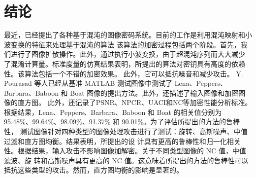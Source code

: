 \chapter{结论}

最近，已经提出了各种基于混沌的图像密码系统。目前的工作是利用混沌映射和小波变换的特征来处理基于混沌的算法
该算法的加密过程包括两个阶段。首先，我们进行了图像扩散操作。此外，通过执行小波变换，由于超混沌序列而大大减少
了混淆计算量。标准度量的仿真结果表明，所提出的算法对密钥具有高度的依赖性。该算法包括一个不错的加密效果。
此外，它可以抵抗噪音和减少攻击。 Y. Pourasad 等人已经从基准 MATLAB 测试图像中测试了
Lena、Peppers、Barbara、Baboon 和 Boat 图像的提出方法。此外，还描述了输入图像和加密图像的直方图。
此外，还记录了PSNR、NPCR、UACI和NC等加密性能分析标准。根据结果​​，Lena、Peppers、Barbara、Baboon 
和 Boat 的相关值分别为 95.48\%、99.64\%、98.09\%、91.37\% 和 90.01\%。为了评估所提出的方法的鲁棒性，
测试图像针对四种类型的图像处理攻击进行了测试：旋转、高斯噪声、中值过滤和直方图均衡。结果表明，所提出的设
计具有更高的鲁棒性和归一化相关性。根据结果​​，输入攻击不影响图像加解密。关于不同类型图像的 NC 值，中值滤波、旋
转和高斯噪声具有更高的 NC 值。这意味着所提出的方法的鲁棒性可以抵抗这些类型的攻击。然而，直方图均衡的影响是显著的。